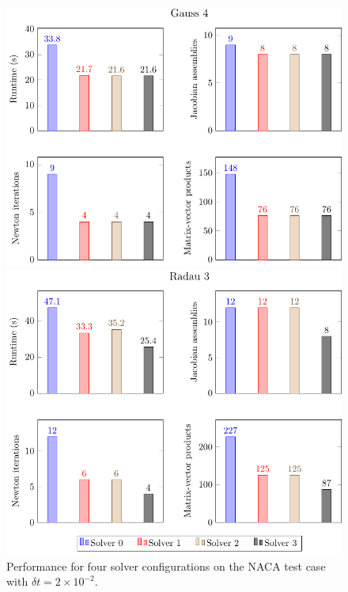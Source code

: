 \documentclass[review]{siamart}
\begin{document}
\begin{figure}
	\centering
	\includegraphics{figures/barchart/gauss4}

	\vspace{\floatsep}

	\includegraphics{figures/barchart/radau3}
	\caption{Performance for four solver configurations on the NACA test case with $\delta t = 2 \times 10^{-2}.$}
	\label{fig:naca-nonlin-solvers}
\end{figure}

\end{document}
